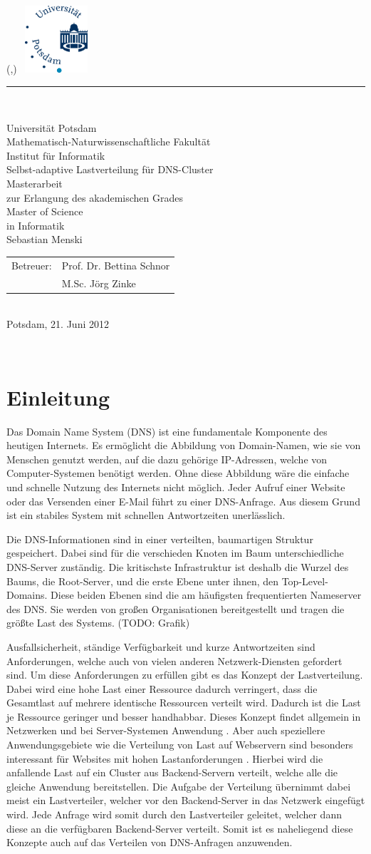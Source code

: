 \documentclass[a4paper, 12pt, BCOR10mm, DIV12, toc=bibliography, toc=listof, german]{scrbook}
\newlength{\TitleMargin}
\newlength{\TitleWidth}
\newcommand{\TitleUni}{Universität Potsdam}
\newcommand{\TitleInstitut}{Mathematisch-Naturwissenschaftliche Fakultät\\Institut für Informatik}
\newcommand{\TitleTitel}{Selbst-adaptive Lastverteilung für DNS-Cluster}
\newcommand{\TitleTyp}{Masterarbeit}
\newcommand{\TitleAutor}{Sebastian Menski}
\newcommand{\TitleBetreuerText}{Betreuer}
\newcommand{\TitleBetreuer}{Prof. Dr. Bettina Schnor\\ &M.Sc. Jörg Zinke}
\newcommand{\TitleAbschlussText}{zur Erlangung des akademischen Grades\\Master of Science\\in Informatik}
\newcommand{\TitleOrt}{Potsdam}
\newcommand{\TitleDatum}{21. Juni 2012}
\renewcommand{\maketitle}{
	\thispagestyle{empty}
	\begin{textblock*}{\TitleWidth}(\TitleMargin,\TitleMargin)
		~\hfill\includegraphics[height=2.5cm]{images/uni-logo}\\[3mm]
		{\color{uniblue}\rule{\TitleWidth}{1mm}}\\[5mm]
		{
			\centering
			\sffamily\Large
			{\LARGE\TitleUni}\\[0.5\baselineskip]
			{\large\TitleInstitut}\\[5\baselineskip]
			{\Huge\TitleTitel}\\[3\baselineskip]

			{\TitleTyp}\\
			\TitleAbschlussText\\[3\baselineskip]

			\TitleAutor\\[6\baselineskip]
			\begin{tabular}{rl}
				\TitleBetreuerText: & \TitleBetreuer
			\end{tabular}\\[3\baselineskip]
			\TitleOrt, \TitleDatum\par
		}
	\end{textblock*}
	~\clearpage
}
\def \dns {Domain Name System (DNS)}
\begin{document}
	\frontmatter
	\maketitle{}
	\tableofcontents{}

	\onehalfspacing{}
	\mainmatter
	\pagestyle{scrheadings}

	\chapter{Einleitung} %
	\label{cha:einleitung}

		Das \dns{} \cite{rfc1034, rfc1035} ist eine fundamentale Komponente des heutigen Internets. Es
		ermöglicht die Abbildung von Domain-Namen, wie sie von Menschen genutzt werden, auf die dazu
		gehörige IP-Adressen, welche von Computer-Systemen benötigt werden. Ohne diese Abbildung wäre
		die einfache und schnelle Nutzung des Internets nicht möglich. Jeder Aufruf einer Website oder
		das Versenden einer E-Mail führt zu einer DNS-Anfrage. Aus diesem Grund ist ein stabiles System
		mit schnellen Antwortzeiten unerlässlich.
		
		Die DNS-Informationen sind in einer verteilten, baumartigen Struktur gespeichert.  Dabei sind für
		die verschieden Knoten im Baum unterschiedliche DNS-Server zuständig. Die kritischste
		Infrastruktur ist deshalb die Wurzel des Baums, die Root-Server, und die erste Ebene unter
		ihnen, den Top-Level-Domains. Diese beiden Ebenen sind die am häufigsten frequentierten
		Nameserver des DNS. Sie werden von großen Organisationen bereitgestellt und tragen die größte
		Last des Systems. (TODO: Grafik)

		Ausfallsicherheit, ständige Verfügbarkeit und kurze Antwortzeiten sind Anforderungen, welche
		auch von vielen anderen Netzwerk-Diensten gefordert sind. Um diese Anforderungen zu erfüllen
		gibt es das Konzept der Lastverteilung. Dabei wird eine hohe Last einer Ressource dadurch
		verringert, dass die Gesamtlast auf mehrere identische Ressourcen verteilt wird. Dadurch ist die
		Last je Ressource geringer und besser handhabbar. Dieses Konzept findet allgemein in Netzwerken
		und bei Server-Systemen Anwendung \cite{bourke2001, kopparapu2002}. Aber auch speziellere
		Anwendungsgebiete wie die Verteilung von Last auf Webservern sind besonders interessant für
		Websites mit hohen Lastanforderungen \cite{meplho2012}. Hierbei wird die anfallende Last auf ein
		Cluster aus Backend-Servern verteilt, welche alle	die gleiche Anwendung bereitstellen. Die
		Aufgabe der Verteilung übernimmt dabei meist ein Lastverteiler, welcher vor den Backend-Server
		in das Netzwerk eingefügt wird. Jede Anfrage wird somit durch den Lastverteiler geleitet,
		welcher dann diese an die verfügbaren Backend-Server verteilt.  Somit ist es naheliegend diese
		Konzepte auch auf das Verteilen von DNS-Anfragen anzuwenden.
\end{document}

